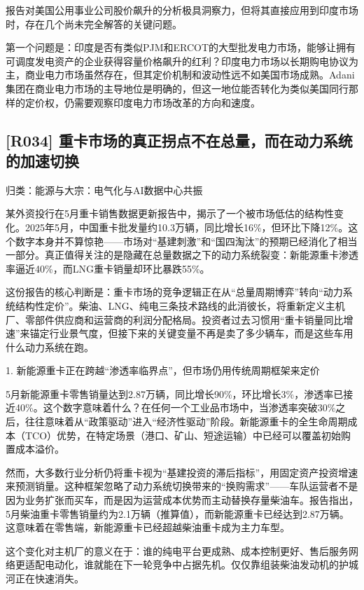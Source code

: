 \documentclass[11pt]{ctexart}
\begin{document}
报告对美国公用事业公司股价飙升的分析极具洞察力，但将其直接应用到印度市场时，存在几个尚未完全解答的关键问题。

第一个问题是：印度是否有类似PJM和ERCOT的大型批发电力市场，能够让拥有可调度发电资产的企业获得容量价格飙升的红利？印度电力市场以长期购电协议为主，商业电力市场虽然存在，但其定价机制和波动性远不如美国市场成熟。Adani集团在商业电力市场的主导地位是明确的，但这一地位能否转化为类似美国同行那样的定价权，仍需要观察印度电力市场改革的方向和速度。

\subsection{[R034] 重卡市场的真正拐点不在总量，而在动力系统的加速切换}
{\small\color{refgray}归类：能源与大宗：电气化与AI数据中心共振}

某外资投行在5月重卡销售数据更新报告中，揭示了一个被市场低估的结构性变化。2025年5月，中国重卡批发量约10.3万辆，同比增长16\%，但环比下降12\%。这个数字本身并不算惊艳——市场对“基建刺激”和“国四淘汰”的预期已经消化了相当一部分。真正值得关注的是隐藏在总量数据之下的动力系统裂变：新能源重卡渗透率逼近40\%，而LNG重卡销量却环比暴跌55\%。

这份报告的核心判断是：重卡市场的竞争逻辑正在从“总量周期博弈”转向“动力系统结构性定价”。柴油、LNG、纯电三条技术路线的此消彼长，将重新定义主机厂、零部件供应商和运营商的利润分配格局。投资者过去习惯用“重卡销量同比增速”来锚定行业景气度，但接下来的关键变量不再是卖了多少辆车，而是这些车用什么动力系统在跑。

1. 新能源重卡正在跨越“渗透率临界点”，但市场仍用传统周期框架来定价

5月新能源重卡零售销量达到2.87万辆，同比增长90\%，环比增长3\%，渗透率已接近40\%。这个数字意味着什么？在任何一个工业品市场中，当渗透率突破30\%之后，往往意味着从“政策驱动”进入“经济性驱动”阶段。新能源重卡的全生命周期成本（TCO）优势，在特定场景（港口、矿山、短途运输）中已经可以覆盖初始购置成本溢价。

然而，大多数行业分析仍将重卡视为“基建投资的滞后指标”，用固定资产投资增速来预测销量。这种框架忽略了动力系统切换带来的“换购需求”——车队运营者不是因为业务扩张而买车，而是因为运营成本优势而主动替换存量柴油车。报告指出，5月柴油重卡零售销量约为2.1万辆（推算值），而新能源重卡已经达到2.87万辆。这意味着在零售端，新能源重卡已经超越柴油重卡成为主力车型。

这个变化对主机厂的意义在于：谁的纯电平台更成熟、成本控制更好、售后服务网络更适配电动化，谁就能在下一轮竞争中占据先机。仅仅靠组装柴油发动机的护城河正在快速消失。
\end{document}
